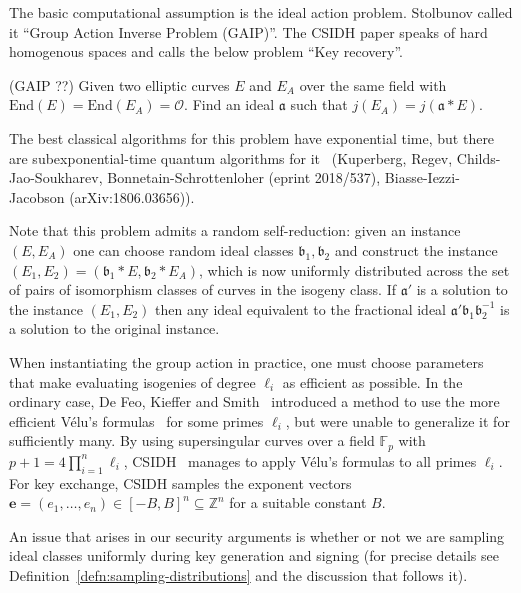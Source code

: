 \documentclass{llncs}
\newcommand{\F}{\mathbb{F}}
\newcommand{\OO}{\mathcal{O}}
\newcommand{\Z}{\mathbb{Z}}
\newcommand{\End}{\text{End}}
\newcommand{\Cl}{\text{Cl}}
\renewcommand{\a}{\mathfrak{a}}
\renewcommand{\b}{\mathfrak{b}}
\newcommand{\e}{\textbf{e}}
\begin{document}
The basic computational assumption is the ideal action problem.
Stolbunov called it ``Group Action Inverse Problem (GAIP)''.
The CSIDH paper speaks of hard homogenous spaces and calls the below problem ``Key recovery''.

\begin{definition}\label{defn:ass1} (GAIP ??)
Given two elliptic curves $E$ and $E_A$ over the same field with $\End(E) = \End(E_A) = \OO$. Find an ideal $\a$ such that $j( E_A ) = j( \a * E )$.
\end{definition}

The best classical algorithms for this problem have exponential time, but there are subexponential-time quantum algorithms for it~\cite{Kup,regev04,childs2014constructing,Kuperberg2013} (Kuperberg, Regev, Childs-Jao-Soukharev, Bonnetain-Schrottenloher (eprint 2018/537), Biasse-Iezzi-Jacobson (arXiv:1806.03656)).

Note that this problem admits a random self-reduction: given an instance $(E, E_A)$ one can choose random ideal classes $\b_1, \b_2$ and construct the instance $(E_1, E_2) = (\b_1 * E, \b_2 * E_A )$, which is now uniformly distributed across the set of pairs of isomorphism classes of curves in the isogeny class.
If $\a'$ is a solution to the instance $(E_1, E_2)$ then any ideal equivalent to the fractional ideal $\a'\b_1 \b_2^{-1}$ is a solution to the original instance.

When instantiating the group action in practice, one must choose parameters that make evaluating isogenies of degree $\ell_i$ as efficient as possible.
In the ordinary case, De Feo, Kieffer and Smith~\cite{DFKS18} introduced a method to use the more efficient V\'elu's formulas~\cite{velu71} for some primes $\ell_i$, but were unable to generalize it for sufficiently many.
By using supersingular curves over a field $\F_p$ with $p+1 = 4\prod_{i=1}^n\ell_i$, CSIDH~\cite{CLMPR18} manages to apply V\'elu's formulas to all primes $\ell_i$.
For key exchange, CSIDH samples the exponent vectors $\e = (e_1, \dots, e_n) \in [-B,B]^n \subseteq \Z^n$ for a suitable constant $B$.



An issue that arises in our security arguments is whether or not we are sampling ideal classes uniformly during key generation and signing (for precise details see Definition~\ref{defn:sampling-distributions} and the discussion that follows it).
\end{document}
